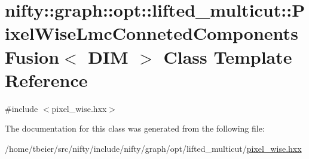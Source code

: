 \hypertarget{classnifty_1_1graph_1_1opt_1_1lifted__multicut_1_1PixelWiseLmcConnetedComponentsFusion}{}\section{nifty\+:\+:graph\+:\+:opt\+:\+:lifted\+\_\+multicut\+:\+:Pixel\+Wise\+Lmc\+Conneted\+Components\+Fusion$<$ D\+IM $>$ Class Template Reference}
\label{classnifty_1_1graph_1_1opt_1_1lifted__multicut_1_1PixelWiseLmcConnetedComponentsFusion}


{\ttfamily \#include $<$pixel\+\_\+wise.\+hxx$>$}



The documentation for this class was generated from the following file\+:\begin{DoxyCompactItemize}
\item 
/home/tbeier/src/nifty/include/nifty/graph/opt/lifted\+\_\+multicut/\hyperlink{pixel__wise_8hxx}{pixel\+\_\+wise.\+hxx}\end{DoxyCompactItemize}

